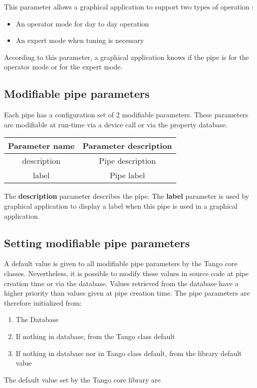 \vspace{0.3cm}

This parameter allows a graphical application to support two types
of operation :
\begin{itemize}
\item An operator mode for day to day operation
\item An expert mode when tuning is necessary
\end{itemize}
According to this parameter, a graphical application knows if the
pipe is for the operator mode or for the expert mode.

\subsection{Modifiable pipe parameters}

Each pipe has a configuration set of 2 modifiable parameters. These
parameters are modifiable at run-time via a device call or via the
property database.

\vspace{0.3cm}

\begin{center}
\begin{longtable}{|c|c|}
\hline 
Parameter name & Parameter description\tabularnewline
\hline 
\hline 
description & Pipe description\tabularnewline
\hline 
label & Pipe label\tabularnewline
\hline 
\end{longtable}
\par\end{center}

\vspace{0.3cm}

The \textbf{description} parameter describes the
pipe. The \textbf{label} parameter is used by graphical
application to display a label when this pipe is used in a graphical
application.

\subsection{Setting modifiable pipe parameters}

A default value is given to all modifiable pipe parameters by the
Tango core classes. Nevertheless, it is possible to modify these values
in source code at pipe creation time or via the database. Values retrieved
from the database have a higher priority than values given at pipe
creation time. The pipe parameters are therefore initialized from:
\begin{enumerate}
\item The Database
\item If nothing in database, from the Tango class default
\item If nothing in database nor in Tango class default, from the library
default value
\end{enumerate}
The default value set by the Tango core library are

